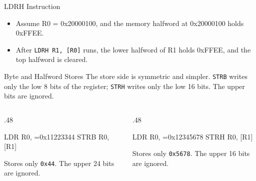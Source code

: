 \documentclass[9pt,aspectratio=169,xcolor=table]{beamer}
\begin{document}
{\begin{frame}[fragile]{LDRH Instruction}
{%
	}
	\vspace{4mm}

	\begin{itemize}
		\item Assume R0 = 0x20000100, and the \alert{memory halfword} at 0x20000100 holds 0xFFEE.
		\item After \texttt{LDRH R1, [R0]} runs, the lower halfword of R1 holds 0xFFEE, and the top halfword is \alert{cleared}.
	\end{itemize}
\end{frame}
}

\begin{frame}[fragile]{Byte and Halfword Stores}
    \leavevmode
    {\small The store side is symmetric and simpler. \texttt{STRB} writes
    only the low 8 bits of the register; \texttt{STRH} writes only the low
    16 bits. The upper bits are \alert{ignored}.}

    \vspace{3mm}
    \begin{columns}[T]
    \begin{column}{.48\textwidth}
        \begin{asm}[basicstyle=\normalsize\ttfamily]
LDR   R0, =0x11223344
STRB  R0, [R1]
\end{asm}

        \vspace{2mm}
        {\small Stores only \texttt{0x44}. The upper 24 bits are ignored.}
    \end{column}
    \begin{column}{.48\textwidth}
        \begin{asm}[basicstyle=\normalsize\ttfamily]
LDR   R0, =0x12345678
STRH  R0, [R1]
\end{asm}

        \vspace{2mm}
        {\small Stores only \texttt{0x5678}. The upper 16 bits are ignored.}
    \end{column}
    \end{columns}
\end{frame}
\end{document}

